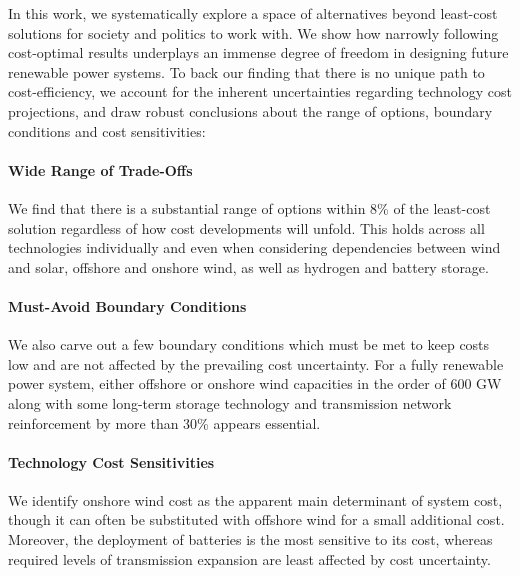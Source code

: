 In this work, we systematically explore a space of alternatives beyond
least-cost solutions for society and politics to work with. We show how narrowly
following cost-optimal results underplays an immense degree of freedom in
designing future renewable power systems. To back our finding that there is no
unique path to cost-efficiency, we account for the inherent uncertainties
regarding technology cost projections, and draw robust conclusions about the
range of options, boundary conditions and cost sensitivities:

\paragraph{Wide Range of Trade-Offs}
We find that there is a substantial range of options
within 8\% of the least-cost solution
regardless of how cost developments will unfold.
This holds across all technologies individually
and even when considering dependencies between
wind and solar, offshore and onshore wind, as well as hydrogen and battery storage.

\paragraph{Must-Avoid Boundary Conditions}
We also carve out a few boundary conditions which
must be met to keep costs low and are not affected
by the prevailing cost uncertainty.
For a fully renewable power system,
either offshore or onshore wind capacities
in the order of 600 GW
along with some long-term storage technology and
transmission network reinforcement by more than 30\% appears essential.


\paragraph{Technology Cost Sensitivities}
We identify onshore wind cost as the apparent main determinant of system cost,
though it can often be substituted with offshore wind for a small additional cost.
Moreover, the deployment of batteries is the most sensitive to its cost,
whereas required levels of transmission expansion are least affected by cost uncertainty. \\

